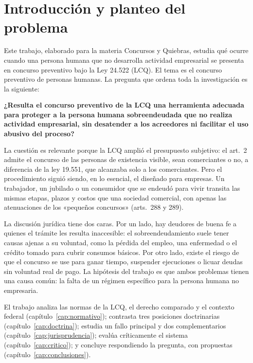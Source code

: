 \documentclass[12pt,oneside]{book}
\begin{document}

\chapter[Introducción y planteo del problema]{Introducción y planteo del problema}
\label{cap:introduccion}

Este trabajo, elaborado para la materia Concursos y Quiebras, estudia qué ocurre cuando una persona humana que no desarrolla actividad empresarial se presenta en concurso preventivo bajo la Ley 24.522 (LCQ). El tema es el concurso preventivo de personas humanas. La pregunta que ordena toda la investigación es la siguiente:

\begin{important}
\textbf{¿Resulta el concurso preventivo de la LCQ una herramienta adecuada para proteger a la persona humana sobreendeudada que no realiza actividad empresarial, sin desatender a los acreedores ni facilitar el uso abusivo del proceso?}
\end{important}

La cuestión es relevante porque la LCQ amplió el presupuesto subjetivo: el art.~2 admite el concurso de las personas de existencia visible, sean comerciantes o no, a diferencia de la ley 19.551, que alcanzaba solo a los comerciantes. Pero el procedimiento siguió siendo, en lo esencial, el diseñado para empresas. Un trabajador, un jubilado o un consumidor que se endeudó para vivir transita las mismas etapas, plazos y costos que una sociedad comercial, con apenas las atenuaciones de los «pequeños concursos» (arts.~288 y 289).

La discusión jurídica tiene dos caras. Por un lado, hay deudores de buena fe a quienes el trámite les resulta inaccesible: el sobreendeudamiento suele tener causas ajenas a su voluntad, como la pérdida del empleo, una enfermedad o el crédito tomado para cubrir consumos básicos. Por otro lado, existe el riesgo de que el concurso se use para ganar tiempo, suspender ejecuciones o licuar deudas sin voluntad real de pago. La hipótesis del trabajo es que ambos problemas tienen una causa común: la falta de un régimen específico para la persona humana no empresaria.

El trabajo analiza las normas de la LCQ, el derecho comparado y el contexto federal (capítulo~\ref{cap:normativo}); contrasta tres posiciones doctrinarias (capítulo~\ref{cap:doctrina}); estudia un fallo principal y dos complementarios (capítulo~\ref{cap:jurisprudencia}); evalúa críticamente el sistema (capítulo~\ref{cap:critico}); y concluye respondiendo la pregunta, con propuestas (capítulo~\ref{cap:conclusiones}).
\end{document}
